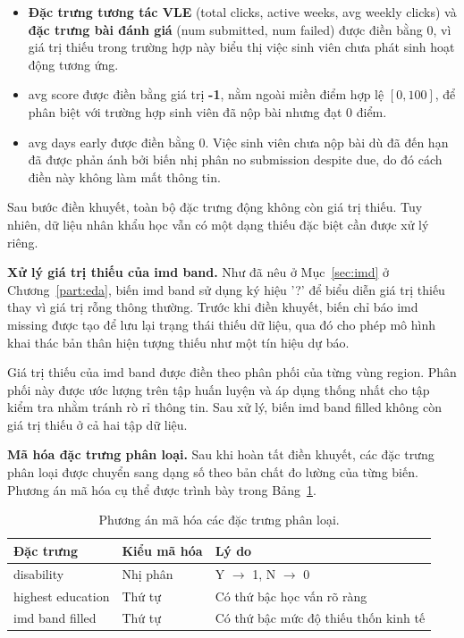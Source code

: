 \documentclass[a4paper]{report}
\newcommand{\code}[1]{{\ttfamily\def\_{\textunderscore\discretionary{}{}{}}#1}}
\def\code#1{#1}%
\def\_{ }%
\begin{document}
\begin{itemize}[leftmargin=*]
  \item \textbf{Đặc trưng tương tác VLE}
        (\code{total\_clicks},
        \code{active\_weeks},
        \code{avg\_weekly\_clicks}) và \textbf{đặc trưng bài đánh giá}
        (\code{num\_submitted},
        \code{num\_failed}) được điền bằng 0, vì giá trị thiếu trong trường
        hợp này biểu thị việc sinh viên chưa phát sinh hoạt động tương ứng.
  \item \code{avg\_score} được điền bằng giá trị \textbf{-1}, nằm ngoài miền
        điểm hợp lệ $[0,100]$, để phân biệt với trường hợp sinh viên đã nộp
        bài nhưng đạt 0 điểm.
  \item \code{avg\_days\_early} được điền bằng 0. Việc sinh viên chưa nộp bài
        dù đã đến hạn đã được phản ánh bởi biến nhị phân
        \code{no\_submission\_despite\_due}, do đó cách điền này không làm mất
        thông tin.
\end{itemize}

Sau bước điền khuyết, toàn bộ đặc trưng động không còn giá trị thiếu. Tuy
nhiên, dữ liệu nhân khẩu học vẫn có một dạng thiếu đặc biệt cần được xử lý
riêng.

\textbf{Xử lý giá trị thiếu của \code{imd\_band}.} Như đã nêu ở
Mục~\ref{sec:imd} ở Chương~\ref{part:eda}, biến \code{imd\_band} sử dụng ký hiệu
\code{'?'} để biểu diễn giá trị
thiếu thay vì giá trị rỗng thông thường. Trước khi điền khuyết, biến chỉ báo
\code{imd\_missing} được tạo để lưu lại trạng thái thiếu dữ liệu, qua đó cho
phép mô hình khai thác bản thân hiện tượng thiếu như một tín hiệu dự báo.

Giá trị thiếu của \code{imd\_band} được điền theo phân phối của từng vùng
\code{region}. Phân phối này được ước lượng trên tập huấn luyện và áp dụng
thống nhất cho tập kiểm tra nhằm tránh rò rỉ thông tin. Sau xử lý, biến
\code{imd\_band\_filled} không còn giá trị thiếu ở cả hai tập dữ liệu.

\textbf{Mã hóa đặc trưng phân loại.} Sau khi hoàn tất điền khuyết, các đặc
trưng phân loại được chuyển sang dạng số theo bản chất đo lường của từng biến.
Phương án mã hóa cụ thể được trình bày trong Bảng~\ref{tab:encoding}.

\begin{table}[H]
  \centering
  \caption{Phương án mã hóa các đặc trưng phân loại.}
  \label{tab:encoding}
  \small
  \begin{tabular}{>{\raggedright\arraybackslash}p{}
                  >{\raggedright\arraybackslash}p{}
                  >{\raggedright\arraybackslash}p{}}
    \toprule
    \textbf{Đặc trưng} & \textbf{Kiểu mã hóa} & \textbf{Lý do} \\
    \midrule
    \code{disability}         & Nhị phân & Y $\to$ 1, N $\to$ 0 \\
    \code{highest\_education} & Thứ tự & Có thứ bậc học vấn rõ ràng \\
    \code{imd\_band\_filled}  & Thứ tự & Có thứ bậc mức độ thiếu thốn kinh tế \\
    \bottomrule
  \end{tabular}
\end{table}
\end{document}
